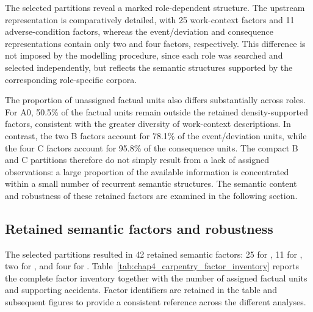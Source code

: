 The selected partitions reveal a marked role-dependent structure. The
upstream representation is comparatively detailed, with 25 work-context
factors and 11 adverse-condition factors, whereas the event/deviation and
consequence representations contain only two and four factors, respectively.
This difference is not imposed by the modelling procedure, since each role was
searched and selected independently, but reflects the semantic structures
supported by the corresponding role-specific corpora.

The proportion of unassigned factual units also differs substantially across
roles. For A0, 50.5\% of the factual units remain outside the retained
density-supported factors, consistent with the greater diversity of
work-context descriptions. In contrast, the two B factors account for 78.1\%
of the event/deviation units, while the four C factors account for 95.8\% of
the consequence units. The compact B and C partitions therefore do not simply
result from a lack of assigned observations: a large proportion of the
available information is concentrated within a small number of recurrent
semantic structures. The semantic content and robustness of these retained
factors are examined in the following section.


\subsection{Retained semantic factors and robustness}
\label{sec:chap4_carpentry_factors}

The selected partitions resulted in 42 retained semantic factors: 25 for
\roleAzero{}, 11 for \roleAone{}, two for \roleB{}, and four for \roleC{}.
Table~\ref{tab:chap4_carpentry_factor_inventory} reports the complete factor
inventory together with the number of assigned factual units and supporting
accidents. Factor identifiers are retained in the table and subsequent figures
to provide a consistent reference across the different analyses.

\footnotesize
\renewcommand{\arraystretch}{1.08}
\setlength{\tabcolsep}{4pt}

